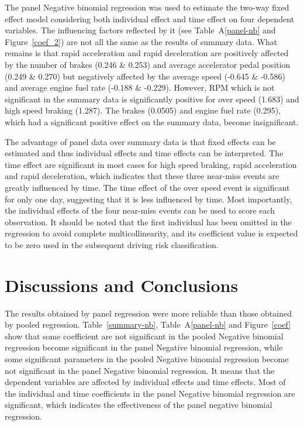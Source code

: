 \documentclass[entropy,article,submit,moreauthors,LaTeX and dvi2pdf]{Definitions/mdpi}
\begin{document}
\begin{paracol}{2}
\linenumbers
\switchcolumn
The panel Negative binomial regression was used to estimate the two-way fixed effect model considering both individual effect and time effect on four dependent variables. The influencing factors reflected by it (see Table~A\ref{panel-nb} and Figure~\ref{coef_2}) are not all the same as the results of summary data. What remains is that rapid acceleration and rapid deceleration are positively affected by the number of brakes (0.246 \& 0.253) and average accelerator pedal position (0.249 \& 0.270) but negatively affected by the average speed (-0.645 \& -0.586) and average engine fuel rate (-0.188 \& -0.229). However, RPM which is not significant in the summary data is significantly positive for over speed (1.683) and high speed braking (1.287). The brakes (0.0505) and engine fuel rate (0.295), which had a significant positive effect on the summary data, become insignificant.

The advantage of panel data over summary data is that fixed effects can be estimated and thus individual effects and time effects can be interpreted. The time effect are significant in most cases for high speed braking, rapid acceleration and rapid deceleration, which indicates that these three near-miss events are greatly influenced by time. The time effect of the over speed event is significant for only one day, suggesting that it is less influenced by time. Most importantly, the individual effects of the four near-miss events can be used to score each observation. It should be noted that the first individual has been omitted in the regression to avoid complete multicollinearity, and its coefficient value is expected to be zero used in the subsequent driving risk classification.
\section{Discussions and Conclusions}

The results obtained by panel regression were more reliable than those obtained by pooled regression. Table~\ref{summary-nb}, Table~A\ref{panel-nb} and Figure~\ref{coef} show that some coefficient are not significant in the pooled Negative binomial regression become significant in the panel Negative binomial regression, while some significant parameters in the pooled Negative binomial regression become not significant in the panel Negative binomial regression. It means that the dependent variables are affected by individual effects and time effects. Most of the individual and time coefficients in the panel Negative binomial regression are significant, which indicates the effectiveness of the panel negative binomial regression.


\end{paracol}
\end{document}
